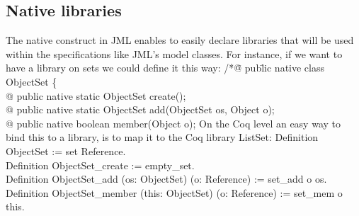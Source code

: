 



\subsection{Native libraries}
The native construct in JML enables to easily declare libraries 
that will be used within the specifications like JML's model classes. 
For instance, if we want to have a library on sets we could define it this way:
\btab
/*\=@ pub\=lic native class ObjectSet \{\+\\
  @\> public native static ObjectSet create();\\
   @\> public native static ObjectSet add(ObjectSet os, Object o);\\
   @\> public native boolean member(Object o);
\etab
On the Coq level an easy way to bind this to a library, is to map it to the Coq library ListSet:
\btab
Definition ObjectSet := set Reference. \\
Definition ObjectSet\_create := empty\_set.\\
Definition ObjectSet\_add (os: ObjectSet) (o: Reference) :=  set\_add o os.\\
 Definition ObjectSet\_member (this: ObjectSet) (o: Reference) := set\_mem o this.
\etab

